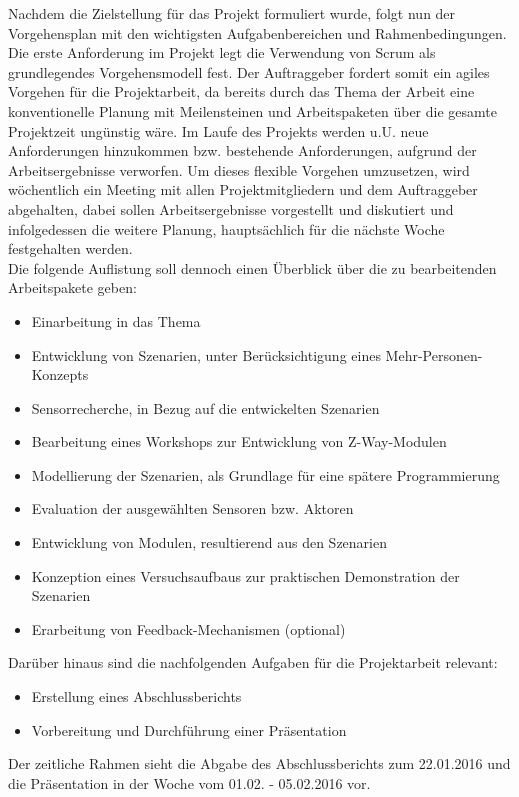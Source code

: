 \documentclass[12pt, oneside, smallheadings]{scrbook}
\begin{document}
Nachdem die Zielstellung für das Projekt formuliert wurde, folgt nun der Vorgehensplan mit den wichtigsten Aufgabenbereichen und Rahmenbedingungen. Die erste Anforderung im Projekt legt die Verwendung von Scrum als grundlegendes Vorgehensmodell fest. Der Auftraggeber fordert somit ein agiles Vorgehen für die Projektarbeit, da bereits durch das Thema der Arbeit eine konventionelle Planung mit Meilensteinen und Arbeitspaketen über die gesamte Projektzeit ungünstig wäre. Im Laufe des Projekts werden u.U. neue Anforderungen hinzukommen bzw. bestehende Anforderungen, aufgrund der Arbeitsergebnisse verworfen. Um dieses flexible Vorgehen umzusetzen, wird wöchentlich ein Meeting mit allen Projektmitgliedern und dem Auftraggeber abgehalten, dabei sollen Arbeitsergebnisse vorgestellt und diskutiert und infolgedessen die weitere Planung, hauptsächlich für die nächste Woche festgehalten werden.\\
Die folgende Auflistung soll dennoch einen Überblick über die zu bearbeitenden \glqq Arbeitspakete\grqq{} geben:\\

\begin{itemize}
\item Einarbeitung in das Thema
\item Entwicklung von Szenarien, unter Berücksichtigung eines Mehr-Personen-Konzepts
\item Sensorrecherche, in Bezug auf die entwickelten Szenarien
\item Bearbeitung eines Workshops zur Entwicklung von Z-Way-Modulen
\item Modellierung der Szenarien, als Grundlage für eine spätere Programmierung
\item Evaluation der ausgewählten Sensoren bzw. Aktoren
\item Entwicklung von Modulen, resultierend aus den Szenarien
\item Konzeption eines Versuchsaufbaus zur praktischen Demonstration der Szenarien
\item Erarbeitung von Feedback-Mechanismen (optional)\\
\end{itemize}
\noindent
Darüber hinaus sind die nachfolgenden Aufgaben für die Projektarbeit relevant:\\

\begin{itemize}
\item Erstellung eines Abschlussberichts
\item Vorbereitung und Durchführung einer Präsentation\\
\end{itemize}
\noindent
Der zeitliche Rahmen sieht die Abgabe des Abschlussberichts zum 22.01.2016 und die Präsentation in der Woche vom 01.02. - 05.02.2016 vor.
\end{document}
